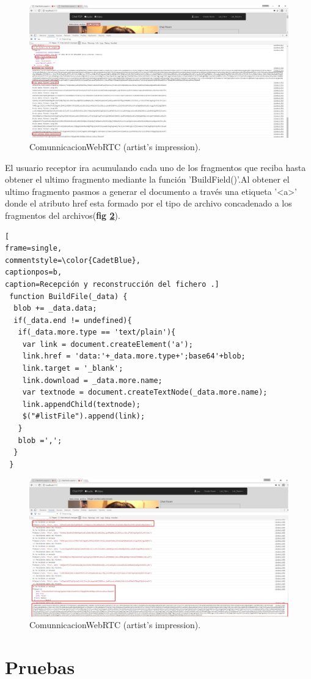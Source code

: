 \begin{figure}[!h]
\centering
\includegraphics[width=0.7\linewidth]{Figures/filSendUser}
\decoRule
\caption[An Electron]{ComunnicacionWebRTC (artist's impression).}
\label{fig:fildSendUser}
\end{figure}
El usuario receptor ira acumulando cada uno de los fragmentos que reciba hasta obtener el ultimo fragmento mediante la función 'BuildField()'.Al obtener el ultimo fragmento pasmos a generar el documento a través una etiqueta '<a>' donde el atributo href esta formado por el tipo de archivo concadenado a los fragmentos del archivos(\textbf{fig \ref{fig:FieldReceiveUser}}).
\begin{lstlisting}[
frame=single,
commentstyle=\color{CadetBlue},
captionpos=b,
caption=Recepción y reconstrucción del fichero .]
 function BuildFile(_data) {
  blob += _data.data;
  if(_data.end != undefined){
   if(_data.more.type == 'text/plain'){
    var link = document.createElement('a');
    link.href = 'data:'+_data.more.type+';base64'+blob;
    link.target = '_blank';
    link.download = _data.more.name;
    var textnode = document.createTextNode(_data.more.name);
    link.appendChild(textnode);
    $("#listFile").append(link);
   }
   blob =',';
  }
 }  
\end{lstlisting}

\begin{figure}[!h]
\centering
\includegraphics[width=0.7\linewidth]{Figures/filReceiveUser}
\decoRule
\caption[An Electron]{ComunnicacionWebRTC (artist's impression).}
\label{fig:FieldReceiveUser}
\end{figure}

\section{Pruebas}
